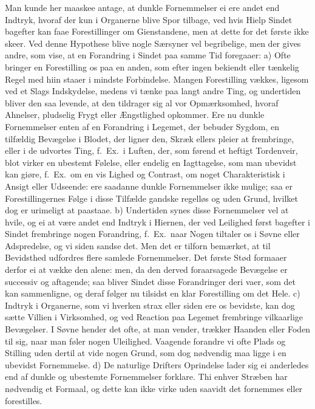 \documentclass[12pt,a4paper]{article}
\newcommand{\opage}[1]{\marginnote{\footnotesize\textit{[#1]}}}
\begin{document}
Man kunde her maaskee antage, at dunkle Fornemmelser ei ere andet end Indtryk, hvoraf
der kun i Organerne blive Spor tilbage, ved hvis Hielp Sindet bagefter kan faae
Forestillinger om Gienstandene, men at dette for det første ikke skeer. Ved denne
Hypothese blive nogle Særsyner vel begribelige, men der gives andre, som vise, at en
Forandring i Sindet paa samme Tid foregaaer: a) Ofte bringer en Forestilling os paa
en anden, som efter ingen bekiendt eller tænkelig Regel med hiin staaer i mindste
Forbindelse. Mangen Forestilling vækkes, ligesom ved et Slags Indskydelse, medens vi
tænke paa langt andre Ting, og undertiden bliver den saa levende, at den tildrager
sig al vor Opmærksomhed, hvoraf Ahnelser, pludselig Frygt eller Ængstlighed
opkommer. Ere nu dunkle Fornemmelser enten af en Forandring i Legemet, der bebuder
Sygdom, en tilfældig Bevægelse i Blodet, der ligner den, Skræk ellers pleier at
frembringe, eller i de udvortes Ting, f.~Ex.\ i Luften, der, som førend et heftigt
Tordenveir,
\opage{50} blot virker en ubestemt Følelse, eller endelig en Iagttagelse, som man ubevidst kan
giøre, f.~Ex.\ om en vis Lighed og Contrast, om noget Charakteristisk i Ansigt eller
Udseende: ere saadanne dunkle Fornemmelser ikke mulige; saa er Forestillingernes
Følge i disse Tilfælde gandske regelløs og uden Grund, hvilket dog er urimeligt at
paastaae. b) Undertiden synes disse Fornemmelser vel at hvile, og ei at være andet
end Indtryk i Hiernen, der ved Leilighed først bagefter i Sindet frembringe nogen
Forandring, f.~Ex.\ naar Nogen tiltaler os i Søvne eller Adspredelse, og vi siden
sandse det. Men det er tilforn bemærket, at til Bevidsthed udfordres flere samlede
Fornemmelser. Det første Stød formaaer derfor ei at vække den alene: men, da den
derved foraarsagede Bevægelse er successiv og aftagende; saa bliver Sindet disse
Forandringer deri vaer, som det kan sammenligne, og deraf følger nu tilsidst en klar
Forestilling om det Hele. c) Indtryk i Organerne, som vi hverken strax eller siden
ere os bevidste, kan dog sætte Villien i Virksomhed, og ved Reaction paa Legemet
frembringe vilkaarlige Bevægelser. I Søvne hender det ofte, at man vender, trækker
Haanden eller Foden til sig, naar man føler nogen Uleilighed. Vaagende forandre vi
ofte Plads og Stilling uden dertil at vide nogen Grund, som dog nødvendig maa ligge i
en ubevidst Fornemmelse. d) De naturlige Drifters Oprindelse lader sig ei anderledes
end af dunkle og ubestemte Fornemmelser forklare.
\opage{51} Thi enhver Stræben har nødvendig et Formaal, og dette kan ikke virke uden saavidt
det fornemmes eller forestilles.
\end{document}
